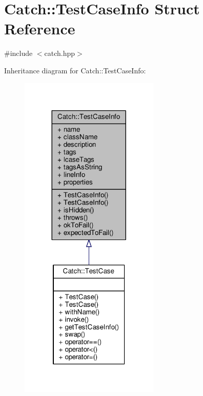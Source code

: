 \hypertarget{struct_catch_1_1_test_case_info}{\section{Catch\-:\-:Test\-Case\-Info Struct Reference}
\label{struct_catch_1_1_test_case_info}
}


{\ttfamily \#include $<$catch.\-hpp$>$}



Inheritance diagram for Catch\-:\-:Test\-Case\-Info\-:
\nopagebreak
\begin{figure}[H]
\begin{center}
\leavevmode
\includegraphics[width=188pt]{struct_catch_1_1_test_case_info__inherit__graph}
\end{center}
\end{figure}


